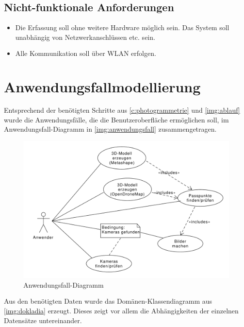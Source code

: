 \documentclass[./00PhotoBox.tex]{subfiles}
\begin{document}
\subsection{Nicht-funktionale Anforderungen}
\begin{itemize}
    \item Die Erfassung soll ohne weitere Hardware möglich sein. Das System soll unabhängig von Netzwerkanschlüssen etc. sein.
    \item Alle Kommunikation soll über WLAN erfolgen.
\end{itemize}

\section{Anwendungsfallmodellierung}
\label{sec:Anwendungsfallmodellierung}

Entsprechend der benötigten Schritte aus \autoref{c:photogrammetrie} und \autoref{img:ablauf} wurde die Anwendungsfälle, die die Benutzeroberfläche ermöglichen soll, im Anwendungsfall-Dia\-gramm in \autoref{img:anwendungsfall} zusammengetragen.

\begin{figure}
    \centering
    \includegraphics[width=1\textwidth]{./img/uml/uml_usecases.pdf}
    \centering
    \caption{Anwendungsfall-Diagramm} %
    \label{img:anwendungsfall} %
\end{figure}

Aus den benötigten Daten wurde das Domänen-Klassendiagramm aus \autoref{img:dokladia} erzeugt. Dieses zeigt vor allem die Abhängigkeiten der einzelnen Datensätze untereinander.
\end{document}
